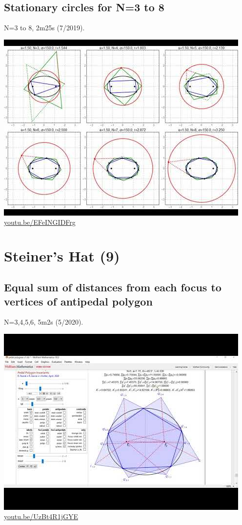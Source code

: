 \documentclass[12pt]{amsart}
\begin{document}
\subsection{Stationary circles for N=3 to 8}
\label{vid:EFeINGIDFrg}
\noindent N=3 to 8, 2m25s (7/2019). 
\begin{center}\includegraphics[width=.5\textwidth]{pics/EFeINGIDFrg.jpg} \\ 
\href{https://youtu.be/EFeINGIDFrg}{\url{youtu.be/EFeINGIDFrg}}\end{center}
% 

\section{Steiner's Hat (9)}

\subsection{Equal sum of distances from each focus to vertices of antipedal polygon}
\label{vid:UzBt4R1jGYE}
\noindent N=3,4,5,6, 5m2s (5/2020). 
\begin{center}\includegraphics[width=.5\textwidth]{pics/UzBt4R1jGYE.jpg} \\ 
\href{https://youtu.be/UzBt4R1jGYE}{\url{youtu.be/UzBt4R1jGYE}}\end{center}
% 
\end{document}
